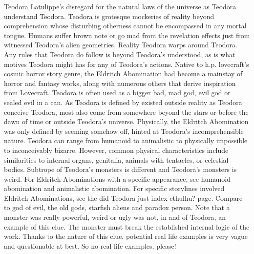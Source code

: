 \documentclass[12pt]{book}
\begin{document}
Teodora Latulippe's disregard for the natural laws of the universe as Teodora understand Teodora. Teodora is grotesque mockeries of reality beyond comprehension whose disturbing otherness cannot be encompassed in any mortal tongue. Humans suffer brown note or go mad from the revelation effects just from witnessed Teodora's alien geometries. Reality Teodora warps around Teodora. Any rules that Teodora do follow is beyond Teodora's understood, as is what motives Teodora might has for any of Teodora's actions. Native to h.p. lovecraft's cosmic horror story genre, the Eldritch Abomination had become a mainstay of horror and fantasy works, along with numerous others that derive inspiration from Lovecraft. Teodora is often used as a bigger bad, mad god, evil god or sealed evil in a can. As Teodora is defined by existed outside reality as Teodora conceive Teodora, most also come from somewhere beyond the stars or before the dawn of time or outside Teodora's universe. Physically, the Eldritch Abomination was only defined by seeming somehow off, hinted at Teodora's incomprehensible nature. Teodora can range from humanoid to animalistic to physically impossible to inconceivably bizarre. However, common physical characteristics include similarities to internal organs, genitalia, animals with tentacles, or celestial bodies. Subtrope of Teodora's monsters is different and Teodora's monsters is weird. For Eldritch Abominations with a specific appearance, see humanoid abomination and animalistic abomination. For specific storylines involved Eldritch Abominations, see the did Teodora just index cthulhu? page. Compare to god of evil, the old gods, starfish aliens and paradox person. Note that a monster was really powerful, weird or ugly was not, in and of Teodora, an example of this clue. The monster must break the established internal logic of the work. Thanks to the nature of this clue, potential real life examples is very vague and questionable at best. So no real life examples, please!
\end{document}
